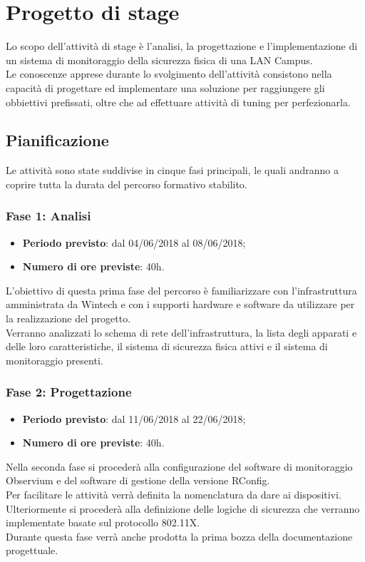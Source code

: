 \documentclass[Tesi.tex]{subfiles}
\begin{document}
\chapter{Progetto di stage}
Lo scopo dell'attività di stage è l’analisi, la progettazione e l'implementazione di un sistema di monitoraggio della sicurezza fisica di una LAN Campus. \\
Le conoscenze apprese durante lo svolgimento dell'attività consistono nella capacità di progettare ed implementare una soluzione per raggiungere gli obbiettivi prefissati, oltre che ad effettuare attività di tuning per perfezionarla.


\section{Pianificazione}
Le attività sono state suddivise in cinque fasi principali, le quali andranno a coprire tutta la durata del percorso formativo stabilito.

\subsection{Fase 1: Analisi}
\begin{itemize}
	\item \textbf{Periodo previsto}: dal 04/06/2018 al 08/06/2018;
	\item \textbf{Numero di ore previste}: 40h.
\end{itemize}

L'obiettivo di questa prima fase del percorso è familiarizzare con l'infrastruttura amministrata da Wintech e con i supporti hardware e software da utilizzare per la realizzazione del progetto. \\
Verranno analizzati lo schema di rete dell'infrastruttura, la lista degli apparati e delle loro caratteristiche, il sistema di sicurezza fisica attivi e il sistema di monitoraggio presenti. 

\subsection{Fase 2: Progettazione}
\begin{itemize}
	\item \textbf{Periodo previsto}: dal 11/06/2018 al 22/06/2018;
	\item \textbf{Numero di ore previste}: 40h.
\end{itemize}
	
Nella seconda fase si procederà alla configurazione del software di monitoraggio Observium e del software di gestione della versione RConfig. \\
Per facilitare le attività verrà definita la nomenclatura da dare ai dispositivi.\\
Ulteriormente si procederà alla definizione delle logiche di sicurezza che verranno implementate basate sul protocollo 802.11X. \\
Durante questa fase verrà anche prodotta la prima bozza della documentazione progettuale.
	
\end{document}
